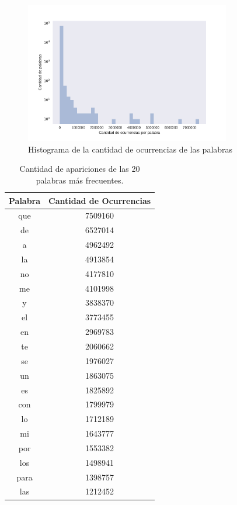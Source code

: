 \begin{figure}[ht]
\centering
\includegraphics[width=0.8\textwidth]{./images/DistribucionOcurrenciasPalabras.pdf} 
\caption{Histograma de la cantidad de ocurrencias de las palabras} 
\label{fig:cantPalabras} 
\end{figure}

\begin{table}[ht]
\centering
\label{tab:palabrasMasOcurrentes}
\begin{tabular}{|c|c|}
\hline
Palabra & Cantidad de Ocurrencias \\ \hline
que     & 7509160                 \\
de      & 6527014                 \\
a       & 4962492                 \\
la      & 4913854                 \\
no      & 4177810                 \\
me      & 4101998                 \\
y       & 3838370                 \\
el      & 3773455                 \\
en      & 2969783                 \\
te      & 2060662                 \\
se      & 1976027                 \\
un      & 1863075                 \\
es      & 1825892                 \\
con     & 1799979                 \\
lo      & 1712189                 \\
mi      & 1643777                 \\
por     & 1553382                 \\
los     & 1498941                 \\
para    & 1398757                 \\
las     & 1212452                 \\
\hline
\end{tabular}
\caption{Cantidad de apariciones de las 20 palabras más frecuentes.}

\end{table}

